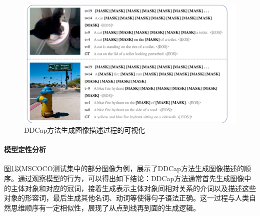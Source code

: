\begin{figure}
  \centering
  \includegraphics[width=1.0\linewidth]{figures/ddcap-generate-order.pdf}
  \caption{DDCap方法生成图像描述过程的可视化}
  \label{fig:ddcap-generate-order}
\end{figure}



\paragraph{模型定性分析} 图\ref{fig:ddcap-generate-order}以MSCOCO测试集中的部分图像为例，展示了DDCap方法生成图像描述的顺序。通过观察模型的行为，可以得出如下结论：DDCap方法通常首先生成图像中的主体对象和对应的冠词，接着生成表示主体对象间相对关系的介词以及描述这些对象的形容词，最后生成其他名词、动词等使得句子语法正确。这一过程与人类自然思维顺序有一定相似性，展现了从点到线再到面的生成逻辑。

